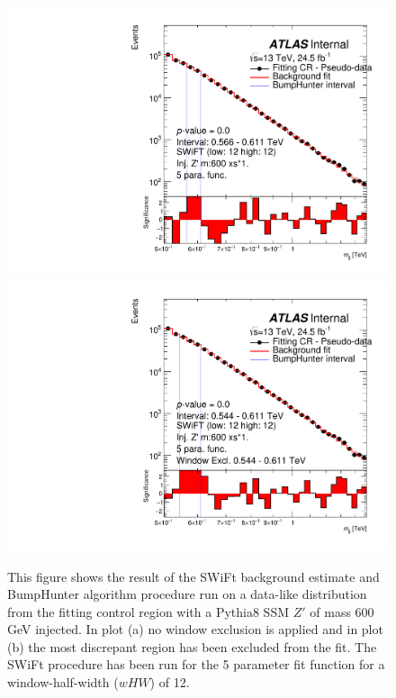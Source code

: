 \begin{figure}[!htb]
\captionsetup[subfigure]{aboveskip=0pt,justification=centering}
\centering
{} {
  \includegraphics[width=0.45\linewidth, angle=0]{figs/Dibjet/LowMass/FitStudy/bhFit_corrFitCR_dataLike_v13_5para_low12_high12_inj_Zprimebb600_xsFactor1.pdf}
}
 {
  \includegraphics[width=0.45\linewidth, angle=0]{figs/Dibjet/LowMass/FitStudy/bhFit_corrFitCR_dataLike_v13_5para_low12_high12_inj_Zprimebb600_xsFactor1_removedWindow.pdf}
}
\caption{  This figure shows the result of the SWiFt background estimate and {\sc BumpHunter} algorithm procedure run on a data-like distribution
  from the fitting control region with a Pythia8 SSM $Z'$ of mass 600 GeV injected.
  In plot (a) no window exclusion is applied and in plot (b) the most discrepant region has been excluded from the fit.
  The SWiFt procedure has been run for the 5 parameter fit function for a window-half-width ($wHW$) of 12.
}
\end{figure}


\FloatBarrier

